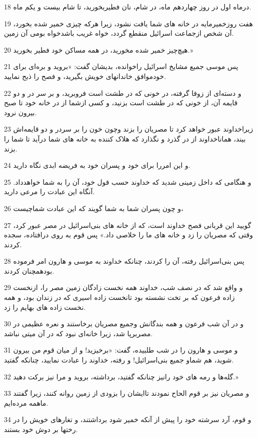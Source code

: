 \par 18 درماه اول در روز چهاردهم ماه، در شام، نان فطیربخورید، تا شام بیست و یکم ماه.
\par 19 هفت روزخمیرمایه در خانه های شما یافت نشود، زیرا هرکه چیزی خمیر شده بخورد، آن شخص ازجماعت اسرائیل منقطع گردد، خواه غریب باشدخواه بومی آن زمین.
\par 20 هیچ‌چیز خمیر شده مخورید، در همه مساکن خود فطیر بخورید.»
\par 21 پس موسی جمیع مشایخ اسرائیل راخوانده، بدیشان گفت: «بروید و بره‌ای برای خودموافق خاندانهای خویش بگیرید، و فصح را ذبح نمایید.
\par 22 و دسته‌ای از زوفا گرفته، در خونی که در طشت است فروبرید، و بر سر در و دو قایمه آن، از خونی که در طشت است بزنید، و کسی ازشما از در خانه خود تا صبح بیرون نرود.
\par 23 زیراخداوند عبور خواهد کرد تا مصریان را بزند وچون خون را بر سردر و دو قایمه‌اش بیند، هماناخداوند از در گذرد و نگذارد که هلاک کننده به خانه های شما درآید تا شما را بزند.
\par 24 و این امررا برای خود و پسران خود به فریضه ابدی نگاه دارید.
\par 25 و هنگامی که داخل زمینی شدید که خداوند حسب قول خود، آن را به شما خواهدداد. آنگاه این عبادت را مرعی دارید.
\par 26 و چون پسران شما به شما گویند که این عبادت شماچیست،
\par 27 گویید این قربانی فصح خداوند است، که از خانه های بنی‌اسرائیل در مصر عبور کرد، وقتی که مصریان را زد و خانه های ما را خلاصی داد.» پس قوم به روی درافتاده، سجده کردند.
\par 28 پس بنی‌اسرائیل رفته، آن را کردند، چنانکه خداوند به موسی و هارون امر فرموده بودهمچنان کردند.
\par 29 و واقع شد که در نصف شب، خداوند همه نخست زادگان زمین مصر را، ازنخست زاده فرعون که بر تخت نشسته بود تانخست زاده اسیری که در زندان بود، و همه نخست زاده های بهایم را زد.
\par 30 و در آن شب فرعون و همه بندگانش وجمیع مصریان برخاستند و نعره عظیمی در مصربرپا شد، زیرا خانه‌ای نبود که در آن میتی نباشد.
\par 31 و موسی و هارون را در شب طلبیده، گفت: «برخیزید! و از میان قوم من بیرون شوید، هم شماو جمیع بنی‌اسرائیل! و رفته، خداوند را عبادت نمایید، چنانکه گفتید.
\par 32 گله‌ها و رمه های خود رانیز چنانکه گفتید، برداشته، بروید و مرا نیز برکت دهید.»
\par 33 و مصریان نیز بر قوم الحاح نمودند تاایشان را بزودی از زمین روانه کنند، زیرا گفتند ماهمه مرده‌ایم.
\par 34 و قوم، آرد سرشته خود را پیش از آنکه خمیر شود برداشتند، و تغارهای خویش را در رختها بر دوش خود بستند.
